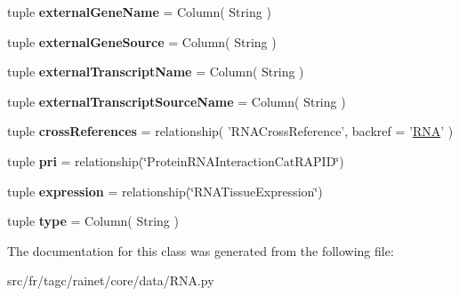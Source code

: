 \begin{DoxyCompactItemize}
\item 
\hypertarget{classsrc_1_1fr_1_1tagc_1_1rainet_1_1core_1_1data_1_1RNA_1_1RNA_a08b165f5e2d785c9f2870b3c03e39008}{tuple {\bfseries external\-Gene\-Name} = Column( String )}\label{classsrc_1_1fr_1_1tagc_1_1rainet_1_1core_1_1data_1_1RNA_1_1RNA_a08b165f5e2d785c9f2870b3c03e39008}

\item 
\hypertarget{classsrc_1_1fr_1_1tagc_1_1rainet_1_1core_1_1data_1_1RNA_1_1RNA_a8595a5f51bcdfa1fa057d8dec60dd8a3}{tuple {\bfseries external\-Gene\-Source} = Column( String )}\label{classsrc_1_1fr_1_1tagc_1_1rainet_1_1core_1_1data_1_1RNA_1_1RNA_a8595a5f51bcdfa1fa057d8dec60dd8a3}

\item 
\hypertarget{classsrc_1_1fr_1_1tagc_1_1rainet_1_1core_1_1data_1_1RNA_1_1RNA_add316590455658fd8a94732e6013a684}{tuple {\bfseries external\-Transcript\-Name} = Column( String )}\label{classsrc_1_1fr_1_1tagc_1_1rainet_1_1core_1_1data_1_1RNA_1_1RNA_add316590455658fd8a94732e6013a684}

\item 
\hypertarget{classsrc_1_1fr_1_1tagc_1_1rainet_1_1core_1_1data_1_1RNA_1_1RNA_a5803db19379819a6e94125ce3f192387}{tuple {\bfseries external\-Transcript\-Source\-Name} = Column( String )}\label{classsrc_1_1fr_1_1tagc_1_1rainet_1_1core_1_1data_1_1RNA_1_1RNA_a5803db19379819a6e94125ce3f192387}

\item 
\hypertarget{classsrc_1_1fr_1_1tagc_1_1rainet_1_1core_1_1data_1_1RNA_1_1RNA_ad924870c46c8dd96f9d66fc5629d03eb}{tuple {\bfseries cross\-References} = relationship( 'R\-N\-A\-Cross\-Reference', backref = '\hyperlink{classsrc_1_1fr_1_1tagc_1_1rainet_1_1core_1_1data_1_1RNA_1_1RNA}{R\-N\-A}' )}\label{classsrc_1_1fr_1_1tagc_1_1rainet_1_1core_1_1data_1_1RNA_1_1RNA_ad924870c46c8dd96f9d66fc5629d03eb}

\item 
\hypertarget{classsrc_1_1fr_1_1tagc_1_1rainet_1_1core_1_1data_1_1RNA_1_1RNA_a539e941506c2bd8495c0f55c7a5075cf}{tuple {\bfseries pri} = relationship(\char`\"{}Protein\-R\-N\-A\-Interaction\-Cat\-R\-A\-P\-I\-D\char`\"{})}\label{classsrc_1_1fr_1_1tagc_1_1rainet_1_1core_1_1data_1_1RNA_1_1RNA_a539e941506c2bd8495c0f55c7a5075cf}

\item 
\hypertarget{classsrc_1_1fr_1_1tagc_1_1rainet_1_1core_1_1data_1_1RNA_1_1RNA_a0df1e7e68b3c72fe8e633385d3347add}{tuple {\bfseries expression} = relationship(\char`\"{}R\-N\-A\-Tissue\-Expression\char`\"{})}\label{classsrc_1_1fr_1_1tagc_1_1rainet_1_1core_1_1data_1_1RNA_1_1RNA_a0df1e7e68b3c72fe8e633385d3347add}

\item 
\hypertarget{classsrc_1_1fr_1_1tagc_1_1rainet_1_1core_1_1data_1_1RNA_1_1RNA_af9b48ee3df548cde04eddf7e0402a203}{tuple {\bfseries type} = Column( String )}\label{classsrc_1_1fr_1_1tagc_1_1rainet_1_1core_1_1data_1_1RNA_1_1RNA_af9b48ee3df548cde04eddf7e0402a203}

\end{DoxyCompactItemize}


The documentation for this class was generated from the following file\-:\begin{DoxyCompactItemize}
\item 
src/fr/tagc/rainet/core/data/R\-N\-A.\-py\end{DoxyCompactItemize}
